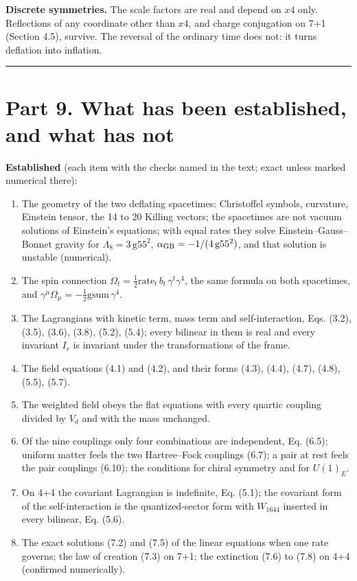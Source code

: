 \documentclass[
  10pt,
]{article}
\providecommand{\tightlist}{%
  \setlength{\itemsep}{0pt}\setlength{\parskip}{0pt}}
\begin{document}
\textbf{Discrete symmetries.} The scale factors are real and depend on
\(x4\) only. Reflections of any coordinate other than \(x4\), and charge
conjugation on 7+1 (Section 4.5), survive. The reversal of the ordinary
time does not: it turns deflation into inflation.

\begin{center}\rule{0.5\linewidth}{0.5pt}\end{center}

\hypertarget{part-9.-what-has-been-established-and-what-has-not}{%
\section{Part 9. What has been established, and what has
not}\label{part-9.-what-has-been-established-and-what-has-not}}

\textbf{Established} (each item with the checks named in the text; exact
unless marked numerical there):

\begin{enumerate}
\def\labelenumi{\arabic{enumi}.}
\tightlist
\item
  The geometry of the two deflating spacetimes: Christoffel symbols,
  curvature, Einstein tensor, the 14 to 20 Killing vectors; the
  spacetimes are not vacuum solutions of Einstein's equations; with
  equal rates they solve Einstein--Gauss--Bonnet gravity for
  \(\Lambda_8=3\,\mathrm{g55}^2\),
  \(\alpha_{\rm GB}=-1/(4\,\mathrm{g55}^2)\), and that solution is
  unstable (numerical).
\item
  The spin connection
  \(\Omega_t=\tfrac12\mathrm{rate}_t\,b_t\,\gamma^t\gamma^4\), the same
  formula on both spacetimes, and
  \(\gamma^\mu\Omega_\mu=-\tfrac12\mathrm{gsum}\,\gamma^4\).
\item
  The Lagrangians with kinetic term, mass term and self-interaction,
  Eqs. (3.2), (3.5), (3.6), (3.8), (5.2), (5.4); every bilinear in them
  is real and every invariant \(I_r\) is invariant under the
  transformations of the frame.
\item
  The field equations (4.1) and (4.2), and their forms (4.3), (4.4),
  (4.7), (4.8), (5.5), (5.7).
\item
  The weighted field obeys the flat equations with every quartic
  coupling divided by \(V_d\) and with the mass unchanged.
\item
  Of the nine couplings only four combinations are independent, Eq.
  (6.5); uniform matter feels the two Hartree--Fock couplings (6.7); a
  pair at rest feels the pair couplings (6.10); the conditions for
  chiral symmetry and for \(U(1)_E\).
\item
  On 4+4 the covariant Lagrangian is indefinite, Eq. (5.1); the
  covariant form of the self-interaction is the quantized-sector form
  with \(W_{1644}\) inserted in every bilinear, Eq. (5.6).
\item
  The exact solutions (7.2) and (7.5) of the linear equations when one
  rate governs; the law of creation (7.3) on 7+1; the extinction (7.6)
  to (7.8) on 4+4 (confirmed numerically).
\end{enumerate}
\end{document}
